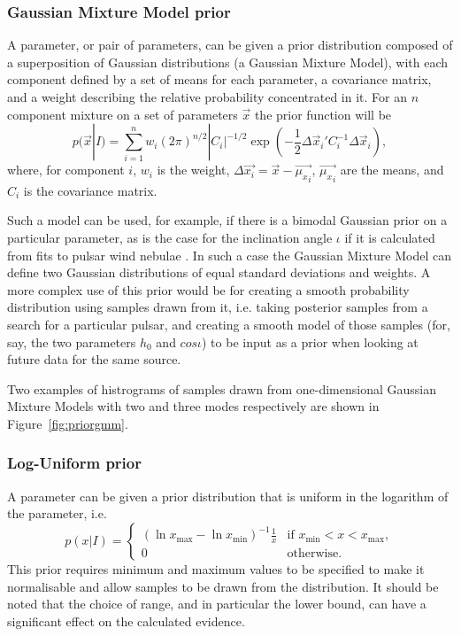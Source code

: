 \subsubsection{Gaussian Mixture Model prior}\label{sec:gmmprior}

A parameter, or pair of parameters, can be given a prior distribution composed of a superposition of Gaussian distributions (a
Gaussian Mixture Model), with each component defined by a set of means for each parameter, a covariance matrix, and a weight
describing the relative probability concentrated in it. For an $n$ component mixture on a set of parameters $\vec{x}$ the prior
function will be
\begin{equation}
 p(\vec{x}|I) = \sum_{i=1}^n w_i(2\pi)^{n/2}|C_i|^{-1/2}\exp{\left(-\frac{1}{2}{\Delta\vec{x}_i}'C_i^{-1}\Delta\vec{x}_i\right)},
\end{equation}
where, for component $i$, $w_i$ is the weight, $\Delta\vec{x_i}= \vec{x}-\vec{{\mu_x}_i}$, $\vec{{\mu_x}_i}$ are the means, and
$C_i$ is the covariance matrix.

Such a model can be used, for example, if there is a bimodal Gaussian prior on a particular parameter, as is the case for the
inclination angle $\iota$ if it is calculated from fits to pulsar wind nebulae \citep[see, e.g., Appendix B in][]{2017arXiv170107709T}. In such a case the Gaussian Mixture Model can define
two Gaussian distributions of equal standard deviations and weights. A more complex use of this prior would be for creating a smooth
probability distribution using samples drawn from it, i.e. taking posterior samples from a search for a particular pulsar, and
creating a smooth model of those samples (for, say, the two parameters $h_0$ and $cos{\iota}$) to be input as a prior when looking
at future data for the same source.

Two examples of histrograms of samples drawn from one-dimensional Gaussian Mixture Models with two and three modes respectively
are shown in Figure~\ref{fig:priorgmm}.

\subsubsection{Log-Uniform prior}\label{sec:loguniform}

A parameter can be given a prior distribution that is uniform in the logarithm of the parameter, i.e.
\begin{equation}
 p(x|I) = \begin{cases}
             \left(\ln{x_{\text{max}}}-\ln{x_{\text{min}}}\right)^{-1}\frac{1}{x} & \text{if } x_{\text{min}} < x < x_{\text{max}}, \\
             0 & \text{otherwise}.
            \end{cases}
\end{equation}
This prior requires minimum and maximum values to be specified to make it normalisable and allow samples to be drawn from the
distribution. It should be noted that the choice of range, and in particular the lower bound, can have a significant effect on
the calculated evidence.

